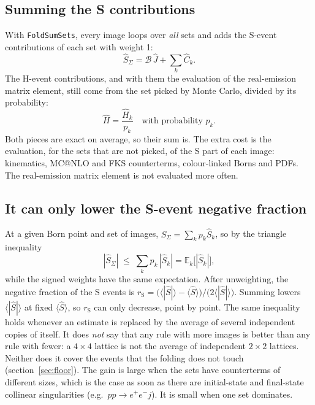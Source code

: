 \documentclass[11pt,a4paper]{article}
\makeatletter
\newcommand{\mcatnlo}{\textsc{MC@NLO}}
\newcommand{\rS}{r_{\mathrm S}}
\newcommand{\code}[1]{\texttt{#1}}
\makeatother
\begin{document}
\subsection{Summing the S contributions}
With \code{FoldSumSets}, every image loops over \emph{all} sets and adds the S-event
contributions of each set with weight 1:
\begin{equation}
  \hat S_\Sigma = \mathcal B\,\hat J+\sum_k \hat C_k .
\end{equation}
The H-event contributions, and with them the evaluation of the real-emission matrix element,
still come from the set picked by Monte Carlo, divided by its probability:
\begin{equation}
  \hat H = \frac{\hat H_k}{p_k}\quad\text{with probability } p_k .
\end{equation}
Both pieces are exact on average, so their sum is. The extra cost is the evaluation, for the
sets that are not picked, of the S part of each image: kinematics, \mcatnlo{} and FKS
counterterms, colour-linked Borns and PDFs. The real-emission matrix element is not
evaluated more often.

\subsection{It can only lower the S-event negative fraction}
At a given Born point and set of images, $\hat S_\Sigma=\sum_k p_k\hat S_k$, so by the triangle
inequality
\begin{equation}
  |\hat S_\Sigma| \;\le\; \sum_k p_k\,|\hat S_k| = \mathbb E_k\big[|\hat S_k|\big],
\end{equation}
while the signed weights have the same expectation. After unweighting, the negative fraction
of the S events is
$\rS=\big(\langle|\hat S|\rangle-\langle\hat S\rangle\big)/\big(2\langle|\hat S|\rangle\big)$.
Summing lowers $\langle|\hat S|\rangle$ at fixed $\langle\hat S\rangle$, so $\rS$ can only
decrease, point by point. The same inequality holds whenever an estimate is replaced by the
average of several independent copies of itself. It does \emph{not} say that any rule with
more images is better than any rule with fewer: a $4\times4$ lattice is not the average of
independent $2\times2$ lattices. Neither does it cover the events that the folding does not
touch (section~\ref{sec:floor}). The gain is large when the sets have counterterms of different
sizes, which is the case as soon as there are initial-state and final-state collinear
singularities (e.g.\ $pp\to e^+e^-j$). It is small when one set dominates.
\end{document}
